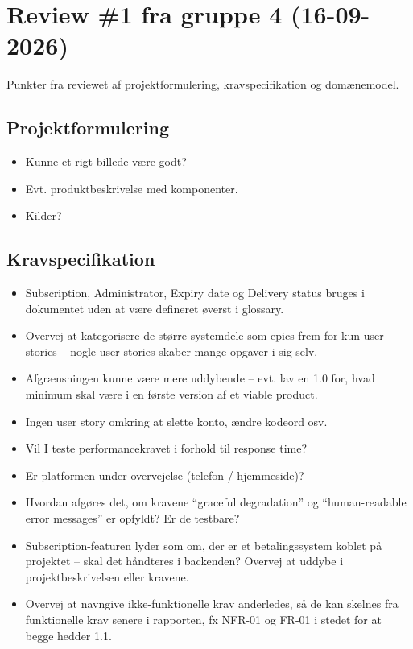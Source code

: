 \documentclass[a4paper,11pt]{article}
\begin{document}
\section*{Review \#1 fra gruppe 4 (16-09-2026)}

Punkter fra reviewet af projektformulering, kravspecifikation og domænemodel.

\subsection*{Projektformulering}

\begin{itemize}
    \item Kunne et rigt billede være godt?
    \item Evt. produktbeskrivelse med komponenter.
    \item Kilder?
\end{itemize}

\subsection*{Kravspecifikation}

\begin{itemize}
    \item Subscription, Administrator, Expiry date og Delivery status bruges i dokumentet uden at være defineret øverst i glossary.
    \item Overvej at kategorisere de større systemdele som epics frem for kun user stories -- nogle user stories skaber mange opgaver i sig selv.
    \item Afgrænsningen kunne være mere uddybende -- evt. lav en 1.0 for, hvad minimum skal være i en første version af et viable product.
    \item Ingen user story omkring at slette konto, ændre kodeord osv.
    \item Vil I teste performancekravet i forhold til response time?
    \item Er platformen under overvejelse (telefon / hjemmeside)?
    \item Hvordan afgøres det, om kravene ``graceful degradation'' og ``human-readable error messages'' er opfyldt? Er de testbare?
    \item Subscription-featuren lyder som om, der er et betalingssystem koblet på projektet -- skal det håndteres i backenden? Overvej at uddybe i projektbeskrivelsen eller kravene.
    \item Overvej at navngive ikke-funktionelle krav anderledes, så de kan skelnes fra funktionelle krav senere i rapporten, fx NFR-01 og FR-01 i stedet for at begge hedder 1.1.
\end{itemize}
\end{document}
